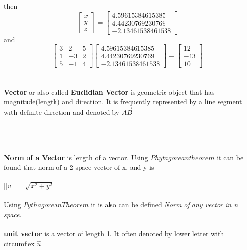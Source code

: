 \documentclass[a4paper, 12pt]{article}
\begin{document}
then 
\[
\left[{
\begin{array}{c}
x \\
y \\
z
\end{array}
}\right] 
=
\left[{
\begin{array}{c}
4.59615384615385 \\
4.44230769230769 \\
-2.13461538461538
\end{array}
}\right] 
\]
and
\[
\left[{
\begin{array}{ccc}
3 & 2 & 5 \\
1 & -3  & 2\\
5 & -1  & 4
\end{array}
} \right]
\left[{
\begin{array}{c}
4.59615384615385 \\
4.44230769230769 \\
-2.13461538461538
\end{array}
}\right] 
=
\left[{
\begin{array}{c} 
12 \\
-13 \\
10
\end{array}
} \right] 
\]
\\
\\
\textbf{Vector} or also called \textbf{Euclidian Vector} is geometric object that has magnitude(length) and direction. It is frequently
represented by a line segment with definite direction and denoted by $\overrightarrow{AB}$
\\
\\ 
\\
\\
\textbf{Norm of a Vector} is length of a vector. Using $Phytagorean theorem$ it can be found that norm of a 2 space vector of x, and y is
\\
\\
$||v|| = \sqrt{x^2 + y^2}$
\\
\\
Using $Pythagorean Theorem$ it is also can be defined \textit{Norm of any vector in n space}.
\\
\\
\textbf{unit vector} is a vector of length 1. It often denoted by lower letter with circumflex $\hat{u}$
\end{document}
